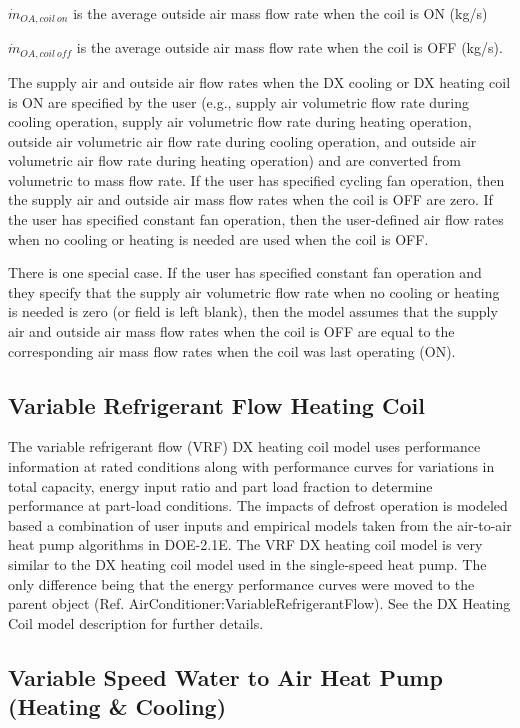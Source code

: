 \(\dot{m}_{OA,coil~on}\) is the average outside air mass flow rate when the coil is ON (kg/s)

\(\dot{m}_{OA,coil~off}\) is the average outside air mass flow rate when the coil is OFF (kg/s).

The supply air and outside air flow rates when the DX cooling or DX heating coil is ON are specified by the user (e.g., supply air volumetric flow rate during cooling operation, supply air volumetric flow rate during heating operation, outside air volumetric air flow rate during cooling operation, and outside air volumetric air flow rate during heating operation) and are converted from volumetric to mass flow rate. If the user has specified cycling fan operation, then the supply air and outside air mass flow rates when the coil is OFF are zero. If the user has specified constant fan operation, then the user-defined air flow rates when no cooling or heating is needed are used when the coil is OFF.

There is one special case. If the user has specified constant fan operation and they specify that the supply air volumetric flow rate when no cooling or heating is needed is zero (or field is left blank), then the model assumes that the supply air and outside air mass flow rates when the coil is OFF are equal to the corresponding air mass flow rates when the coil was last operating (ON).

\subsection{Variable Refrigerant Flow Heating Coil}\label{variable-refrigerant-flow-heating-coil}

The variable refrigerant flow (VRF) DX heating coil model uses performance information at rated conditions along with performance curves for variations in total capacity, energy input ratio and part load fraction to determine performance at part-load conditions. The impacts of defrost operation is modeled based a combination of user inputs and empirical models taken from the air-to-air heat pump algorithms in DOE-2.1E. The VRF DX heating coil model is very similar to the DX heating coil model used in the single-speed heat pump. The only difference being that the energy performance curves were moved to the parent object (Ref. AirConditioner:VariableRefrigerantFlow). See the DX Heating Coil model description for further details.

\subsection{Variable Speed Water to Air Heat Pump (Heating \& Cooling)}\label{variable-speed-water-to-air-heat-pump-heating-cooling}

